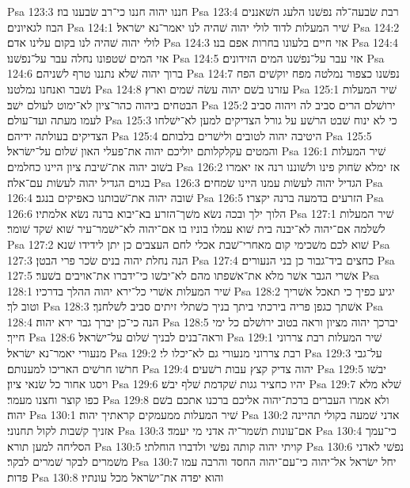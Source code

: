 Psa 123:3  חננו יהוה חננו כי־רב שׂבענו בוז׃
Psa 123:4  רבת שׂבעה־לה נפשׁנו הלעג השׁאננים הבוז לגאיונים׃
Psa 124:1  שׁיר המעלות לדוד לולי יהוה שׁהיה לנו יאמר־נא ישׂראל׃
Psa 124:2  לולי יהוה שׁהיה לנו בקום עלינו אדם׃
Psa 124:3  אזי חיים בלעונו בחרות אפם בנו׃
Psa 124:4  אזי המים שׁטפונו נחלה עבר על־נפשׁנו׃
Psa 124:5  אזי עבר על־נפשׁנו המים הזידונים׃
Psa 124:6  ברוך יהוה שׁלא נתננו טרף לשׁניהם׃
Psa 124:7  נפשׁנו כצפור נמלטה מפח יוקשׁים הפח נשׁבר ואנחנו נמלטנו׃
Psa 124:8  עזרנו בשׁם יהוה עשׂה שׁמים וארץ׃
Psa 125:1  שׁיר המעלות הבטחים ביהוה כהר־ציון לא־ימוט לעולם ישׁב׃
Psa 125:2  ירושׁלם הרים סביב לה ויהוה סביב לעמו מעתה ועד־עולם׃
Psa 125:3  כי לא ינוח שׁבט הרשׁע על גורל הצדיקים למען לא־ישׁלחו הצדיקים בעולתה ידיהם׃
Psa 125:4  היטיבה יהוה לטובים ולישׁרים בלבותם׃
Psa 125:5  והמטים עקלקלותם יוליכם יהוה את־פעלי האון שׁלום על־ישׂראל׃
Psa 126:1  שׁיר המעלות בשׁוב יהוה את־שׁיבת ציון היינו כחלמים׃
Psa 126:2  אז ימלא שׂחוק פינו ולשׁוננו רנה אז יאמרו בגוים הגדיל יהוה לעשׂות עם־אלה׃
Psa 126:3  הגדיל יהוה לעשׂות עמנו היינו שׂמחים׃
Psa 126:4  שׁובה יהוה את־שׁבותנו כאפיקים בנגב׃
Psa 126:5  הזרעים בדמעה ברנה יקצרו׃
Psa 126:6  הלוך ילך ובכה נשׂא משׁך־הזרע בא־יבוא ברנה נשׂא אלמתיו׃
Psa 127:1  שׁיר המעלות לשׁלמה אם־יהוה לא־יבנה בית שׁוא עמלו בוניו בו אם־יהוה לא־ישׁמר־עיר שׁוא שׁקד שׁומר׃
Psa 127:2  שׁוא לכם משׁכימי קום מאחרי־שׁבת אכלי לחם העצבים כן יתן לידידו שׁנא׃
Psa 127:3  הנה נחלת יהוה בנים שׂכר פרי הבטן׃
Psa 127:4  כחצים ביד־גבור כן בני הנעורים׃
Psa 127:5  אשׁרי הגבר אשׁר מלא את־אשׁפתו מהם לא־יבשׁו כי־ידברו את־אויבים בשׁער׃
Psa 128:1  שׁיר המעלות אשׁרי כל־ירא יהוה ההלך בדרכיו׃
Psa 128:2  יגיע כפיך כי תאכל אשׁריך וטוב לך׃
Psa 128:3  אשׁתך כגפן פריה בירכתי ביתך בניך כשׁתלי זיתים סביב לשׁלחנך׃
Psa 128:4  הנה כי־כן יברך גבר ירא יהוה׃
Psa 128:5  יברכך יהוה מציון וראה בטוב ירושׁלם כל ימי חייך׃
Psa 128:6  וראה־בנים לבניך שׁלום על־ישׂראל׃
Psa 129:1  שׁיר המעלות רבת צררוני מנעורי יאמר־נא ישׂראל׃
Psa 129:2  רבת צררוני מנעורי גם לא־יכלו לי׃
Psa 129:3  על־גבי חרשׁו חרשׁים האריכו למענותם׃
Psa 129:4  יהוה צדיק קצץ עבות רשׁעים׃
Psa 129:5  יבשׁו ויסגו אחור כל שׂנאי ציון׃
Psa 129:6  יהיו כחציר גגות שׁקדמת שׁלף יבשׁ׃
Psa 129:7  שׁלא מלא כפו קוצר וחצנו מעמר׃
Psa 129:8  ולא אמרו העברים ברכת־יהוה אליכם ברכנו אתכם בשׁם יהוה׃
Psa 130:1  שׁיר המעלות ממעמקים קראתיך יהוה׃
Psa 130:2  אדני שׁמעה בקולי תהיינה אזניך קשׁבות לקול תחנוני׃
Psa 130:3  אם־עונות תשׁמר־יה אדני מי יעמד׃
Psa 130:4  כי־עמך הסליחה למען תורא׃
Psa 130:5  קויתי יהוה קותה נפשׁי ולדברו הוחלתי׃
Psa 130:6  נפשׁי לאדני משׁמרים לבקר שׁמרים לבקר׃
Psa 130:7  יחל ישׂראל אל־יהוה כי־עם־יהוה החסד והרבה עמו פדות׃
Psa 130:8  והוא יפדה את־ישׂראל מכל עונתיו׃
